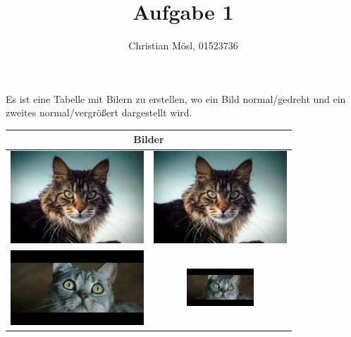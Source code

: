 \documentclass{article}
\author{Christian M\"osl, 01523736}
\title{Aufgabe 1}
\date{}
\begin{document}
\maketitle

\paragraph{} 
Es ist eine Tabelle mit Bilern zu erstellen, wo ein Bild normal/gedreht und ein zweites normal/vergr\"oßert dargestellt wird. \\
\vspace{1cm}

\begin{center}
  \begin{tabular}{|c|c|}
    \hline
    \multicolumn{2}{|c|}{Bilder}  \\ \hline
    \includegraphics[width=5cm]{cat.jpg} & \includegraphics[angle=45,width=5cm]{cat.jpg} \\ \hline
    \includegraphics[width=5cm]{cat2.jpg} & \includegraphics[width=2.5cm]{cat2.jpg} \\ \hline
  \end{tabular}
\end{center}
\end{document}
